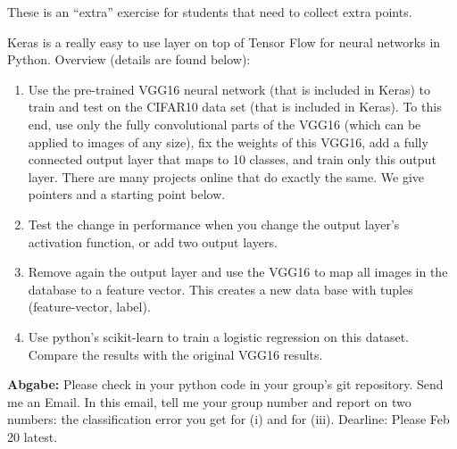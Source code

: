 

\renewcommand{\course}{Artificial Intelligence}
\renewcommand{\coursepicture}{course_ai}
\renewcommand{\coursedate}{Winter 2019}
\renewcommand{\exnum}{7}

\exercises

These is an ``extra'' exercise for students that need to collect extra points.





Keras is a really easy to use layer on top of Tensor Flow for neural networks in Python. Overview (details are found below):
\begin{enumerate}
\item Use the pre-trained VGG16 neural network (that is included in Keras) to train and test on the CIFAR10 data set (that is included in Keras). To this end, use only the fully convolutional parts of the VGG16 (which can be applied to images of any size), fix the weights of this VGG16, add a fully connected output layer that maps to 10 classes, and train only this output layer.
There are many projects online that do exactly the same. We give
pointers and a starting point below.
\item Test the change in performance when you change the output layer's activation function, or add two output layers.
\item Remove again the output layer and use the VGG16 to map all images in the database to a feature vector. This creates a new data base with tuples (feature-vector, label).
\item Use python's scikit-learn to train a logistic regression on this dataset. Compare the results with the original VGG16 results.
\end{enumerate}

\textbf{Abgabe:} Please check in your python code in your group's git repository. Send me an Email. In this email, tell me your group number and report on two numbers: the classification error you get for (i) and for (iii). Dearline: Please Feb 20 latest.

